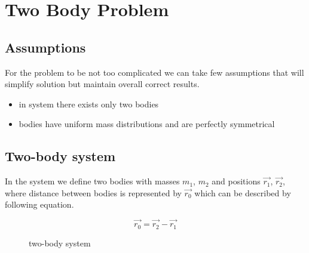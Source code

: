 \documentclass[english,12pt,a4paper, notitlepage]{report}
\begin{document}
		\tableofcontents
	\chapter{Two Body Problem}
	\section{Assumptions}
	For the problem to be not too complicated we can take few assumptions that will simplify solution but maintain overall correct results.
	
	\begin{itemize}
		\item in system there exists only two bodies
		\item bodies have uniform mass distributions and are perfectly symmetrical
	\end{itemize}
	
	\section{Two-body system}
	
	In the system we define two bodies with masses $m_1$, $m_2$ and positions $\vec{r_1}$, $\vec{r_2}$, where distance between bodies is represented by $\vec{r_0}$ which can be described by following equation.
	
	\begin{equation}\label{vec}
		\vec{r_0} = \vec{r_2} - \vec{r_1}
	\end{equation}
	
	\begin{figure}[h!]
		\begin{center}
		\end{center}
		\caption{two-body system}
	\end{figure}	
	
\end{document}
